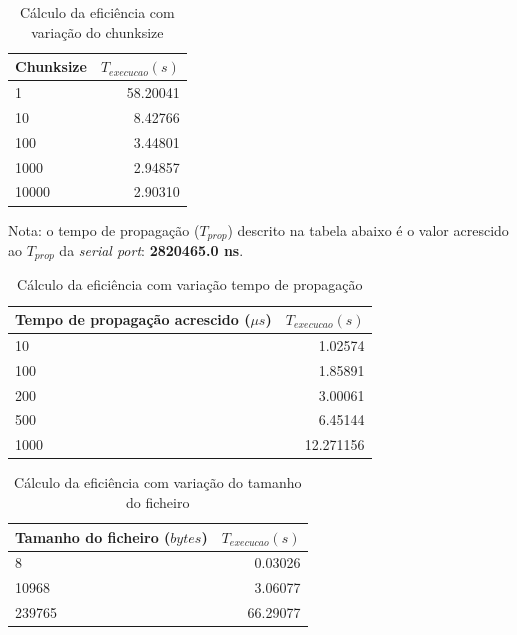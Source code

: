 \documentclass[11pt]{report}
\begin{document}
\begin{table}[h!]
  \begin{center}
    \caption{Cálculo da eficiência com variação do chunksize}
    \label{tab:table1}
    \begin{tabular}{l|r} %
        Chunksize & \textbf{$  T_{execucao} (s) $} \\
      \hline
        1 & 58.20041\\
        10 & 8.42766\\
        100 & 3.44801\\
        1000 & 2.94857\\
        10000 & 2.90310\\
    \end{tabular}
  \end{center}
\end{table}

Nota: o tempo de propagação ($T_{prop}$) descrito na tabela abaixo é o valor
acrescido ao $T_{prop}$ da \textit{serial port}: \textbf{2820465.0 ns}.
\begin{table}[h!]
  \begin{center}
    \caption{Cálculo da eficiência com variação tempo de propagação}
    \label{tab:table1}
    \begin{tabular}{l|r} %
        Tempo de propagação acrescido ($\mu s$) & \textbf{$  T_{execucao} (s) $} \\
      \hline
        10 & 1.02574\\
        100 & 1.85891\\
        200 & 3.00061\\
        500 & 6.45144\\
        1000 & 12.271156\\
    \end{tabular}
  \end{center}
\end{table}

\begin{table}[h!]
  \begin{center}
    \caption{Cálculo da eficiência com variação do tamanho do ficheiro}
    \label{tab:table1}
    \begin{tabular}{l|r} %
        Tamanho do ficheiro ($bytes$) & \textbf{$  T_{execucao} (s) $} \\
      \hline
        8 & 0.03026\\
        10968 & 3.06077\\
        239765 & 66.29077\\
    \end{tabular}
  \end{center}
\end{table}
\end{document}
